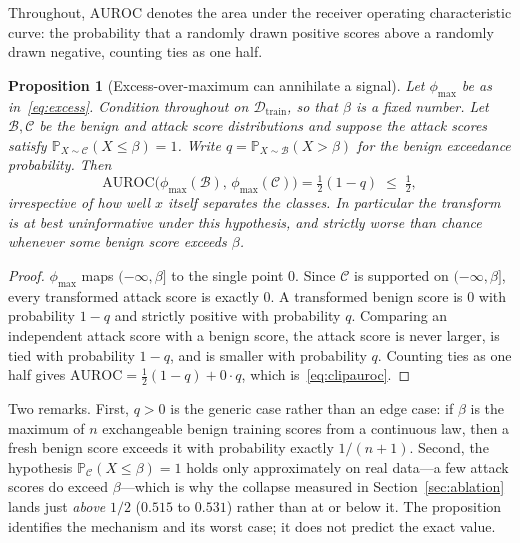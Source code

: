 \documentclass[preprint,12pt,authoryear]{elsarticle}
\newtheorem{proposition}[theorem]{Proposition}
\theoremstyle{definition}
\newcommand{\Prob}{\mathbb{P}}
\newcommand{\Dcal}{\mathcal{D}}
\newcommand{\Ccal}{\mathcal{C}}
\newcommand{\Bcal}{\mathcal{B}}
\begin{document}
Throughout, $\mathrm{AUROC}$ denotes the area under the receiver operating
characteristic curve: the probability that a randomly drawn positive scores above
a randomly drawn negative, counting ties as one half.

\begin{proposition}[Excess-over-maximum can annihilate a signal]\label{prop:clip}
Let $\phi_{\max}$ be as in~\eqref{eq:excess}. Condition throughout on
$\Dcal_{\mathrm{train}}$, so that $\beta$ is a fixed number. Let $\Bcal, \Ccal$ be
the benign and attack score distributions and suppose the attack scores satisfy
$\Prob_{X \sim \Ccal}(X \le \beta) = 1$. Write
$q = \Prob_{X \sim \Bcal}(X > \beta)$ for the benign exceedance probability. Then
\begin{equation}\label{eq:clipauroc}
\mathrm{AUROC}\big(\phi_{\max}(\Bcal),\, \phi_{\max}(\Ccal)\big)
= \tfrac{1}{2}(1 - q) \;\le\; \tfrac{1}{2},
\end{equation}
irrespective of how well $x$ itself separates the classes. In particular the
transform is at best uninformative under this hypothesis, and strictly
\emph{worse} than chance whenever some benign score exceeds $\beta$.
\end{proposition}

\begin{proof}
$\phi_{\max}$ maps $(-\infty, \beta]$ to the single point $0$. Since $\Ccal$ is
supported on $(-\infty,\beta]$, every transformed attack score is exactly $0$. A
transformed benign score is $0$ with probability $1-q$ and strictly positive with
probability $q$. Comparing an independent attack score with a benign score, the
attack score is never larger, is tied with probability $1-q$, and is smaller with
probability $q$. Counting ties as one half gives
$\mathrm{AUROC} = \tfrac{1}{2}(1-q) + 0 \cdot q$, which is~\eqref{eq:clipauroc}.
\end{proof}

Two remarks. First, $q>0$ is the generic case rather than an edge case: if $\beta$
is the maximum of $n$ exchangeable benign training scores from a continuous law,
then a fresh benign score exceeds it with probability exactly $1/(n+1)$. Second,
the hypothesis $\Prob_{\Ccal}(X \le \beta) = 1$ holds only approximately on real
data---a few attack scores do exceed $\beta$---which is why the collapse measured
in Section~\ref{sec:ablation} lands just \emph{above} $1/2$ ($0.515$ to $0.531$)
rather than at or below it. The proposition identifies the mechanism and its worst
case; it does not predict the exact value.
\end{document}
